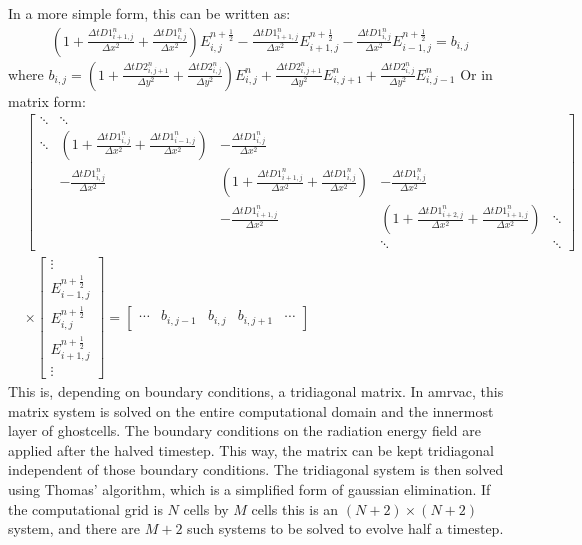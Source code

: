In a more simple form, this can be written as:
\begin{align}
\left(1 + \frac{\Delta t D1_{i+1,j}^{n}}{\Delta x^2} + \frac{\Delta t D1_{i,j}^{n}}{\Delta x^2} \right) E_{i,j}^{n+\frac{1}{2}} - \frac{\Delta t D1_{i+1,j}^{n}}{\Delta x^2} E_{i+1,j}^{n+\frac{1}{2}} - \frac{\Delta t D1_{i,j}^{n}}{\Delta x^2} E_{i-1,j}^{n+\frac{1}{2}} = b_{i,j}
\end{align}
where $b_{i,j} = \left(1 + \frac{\Delta t D2_{i,j+1}^{n}}{\Delta y^2} + \frac{\Delta t D2_{i,j}^{n}}{\Delta y^2}\right) E_{i,j}^{n} + \frac{\Delta t D2_{i,j+1}^{n}}{\Delta y^2} E_{i,j+1}^{n} + \frac{\Delta t D2_{i,j}^{n}}{\Delta y^2} E_{i,j-1}^{n}$
Or in matrix form:
\begin{align}
&\begin{bmatrix}
\ddots & \ddots & & &\\
\ddots & \left(1 + \frac{\Delta t D1_{i,j}^{n}}{\Delta x^2} + \frac{\Delta t D1_{i-1,j}^{n}}{\Delta x^2} \right) & -\frac{\Delta t D1_{i,j}^{n}}{\Delta x^2} & & \\
& -\frac{\Delta t D1_{i,j}^{n}}{\Delta x^2} & \left(1 + \frac{\Delta t D1_{i+1,j}^{n}}{\Delta x^2} + \frac{\Delta t D1_{i,j}^{n}}{\Delta x^2} \right) & - \frac{\Delta t D1_{i,j}^{n}}{\Delta x^2} & \\
& & -\frac{\Delta t D1_{i+1,j}^{n}}{\Delta x^2} & \left(1 + \frac{\Delta t D1_{i+2,j}^{n}}{\Delta x^2} + \frac{\Delta t D1_{i+1,j}^{n}}{\Delta x^2} \right) & \ddots \\
& & & \ddots & \ddots
\end{bmatrix} \\
&\times
\begin{bmatrix}
           \vdots                    \\
           E_{i-1,j}^{n+\frac{1}{2}} \\
           E_{i,j}^{n+\frac{1}{2}}   \\
           E_{i+1,j}^{n+\frac{1}{2}} \\
           \vdots
\end{bmatrix} 
=
\begin{bmatrix}
           \cdots & b_{i,j-1} & b_{i,j} & b_{i,j+1} & \cdots
\end{bmatrix}
\end{align}
This is, depending on boundary conditions, a tridiagonal matrix. In amrvac, this matrix system is solved on the entire computational domain and the innermost layer of ghostcells. The boundary conditions on the radiation energy field are applied after the halved timestep. This way, the matrix can be kept tridiagonal independent of those boundary conditions. The tridiagonal system is then solved using Thomas' algorithm, which is a simplified form of gaussian elimination. If the computational grid is $N$ cells by $M$ cells this is an $(N+2) \times (N+2)$ system, and there are $M+2$ such systems to be solved to evolve half a timestep. \\

